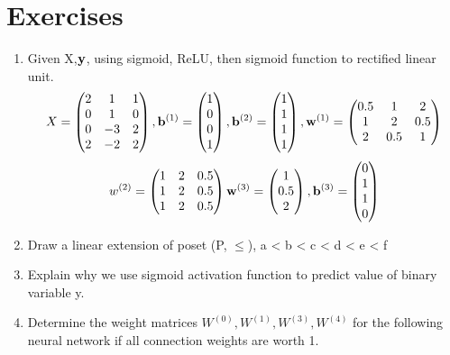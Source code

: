 \section{Exercises}
\begin{enumerate}
    \item Given X,${\vy}$, using sigmoid, ReLU, then sigmoid function to rectified linear unit.
       \begin{equation*}  
        X = \begin{pmatrix}
        2 & 1 & 1\\
        0 & 1 & 0\\
        0 & -3 & 2\\
        2 & -2 & 2
        \end{pmatrix},
        \vb^{(1)} = \begin{pmatrix}
         1\\
         0\\
         0\\
         1
        \end{pmatrix},
        \vb^{(2)} = \begin{pmatrix}
         1\\
         1\\
         1\\
         1
        \end{pmatrix},
        \vw^{(1)} =  \begin{pmatrix}
         0.5 & 1 & 2\\
         1 & 2 & 0.5\\
         2 & 0.5 & 1
        \end{pmatrix}
        \end{equation*}
        \begin{equation*}
         w^{(2)} =  \begin{pmatrix}
         1 & 2 & 0.5\\
         1 & 2 & 0.5\\
         1 & 2 & 0.5
        \end{pmatrix}
         \vw^{(3)} =  \begin{pmatrix}
         1\\
         0.5\\
         2
        \end{pmatrix},
        \vb^{(3)} = \begin{pmatrix}
         0\\
         1\\
         1\\
         0
        \end{pmatrix}
        \end{equation*}
    \item Draw a linear extension of poset (P, $\leq$), a < b < c < d < e < f
    \item Explain why we use sigmoid activation function to predict value of binary variable y.
    \item Determine the weight matrices $W^{(0)}, W^{(1)}, W^{(3)}, W^{(4)}$ for the following neural network if all connection weights are worth 1.
    

\end{enumerate}

